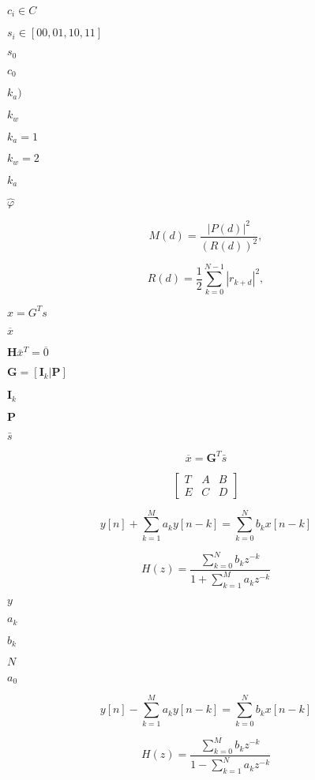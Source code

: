 \documentclass{article}
\begin{document}
$c_i \in C$
\pagebreak

$s_i \in [00, 01, 10, 11]$
\pagebreak

$s_0$
\pagebreak

$c_0$
\pagebreak

$k_a)$
\pagebreak

$k_w$
\pagebreak

$k_a=1$
\pagebreak

$k_w=2$
\pagebreak

$k_a$
\pagebreak

$\hat{\varphi}$
\pagebreak

\[ M(d) = \frac{|P(d)|^2}{(R(d))^2}, \]
\pagebreak

\[ R(d) = \frac{1}{2} \sum_{k=0}^{N-1} |r_{k+d}|^2, \]
\pagebreak

$ x=G^T s $
\pagebreak

$\overline{x}$
\pagebreak

$\mathbf{H}\bar{x}^{T}=\overline{0}$
\pagebreak

$\mathbf{G}=\left[\mathbf{I}_{k}|\mathbf{P}\right]$
\pagebreak

$\mathbf{I}_{k}$
\pagebreak

$\mathbf{P}$
\pagebreak

$\bar{s}$
\pagebreak

\[\overline{x}=\mathbf{G}^{T}\bar{s}\]
\pagebreak

\[\left[\begin{array}{ccc} T & A & B\\ E & C & D \end{array}\right]\]
\pagebreak

\[ y[n] + \sum_{k=1}^{M} a_k y[n-k] = \sum_{k=0}^{N} b_k x[n-k] \]
\pagebreak

\[ H(z) = \frac{\sum_{k=0}^{N} b_k z^{-k}}{1 + \sum_{k=1}^{M} a_k z^{-k}} \]
\pagebreak

$y$
\pagebreak

$a_k$
\pagebreak

$b_k$
\pagebreak

$N$
\pagebreak

$a_0$
\pagebreak

\[ y[n] - \sum_{k=1}^{M} a_k y[n-k] = \sum_{k=0}^{N} b_k x[n-k] \]
\pagebreak

\[ H(z) = \frac{\sum_{k=0}^{M} b_k z^{-k}}{1 - \sum_{k=1}^{N} a_k z^{-k}} \]
\pagebreak
\end{document}
